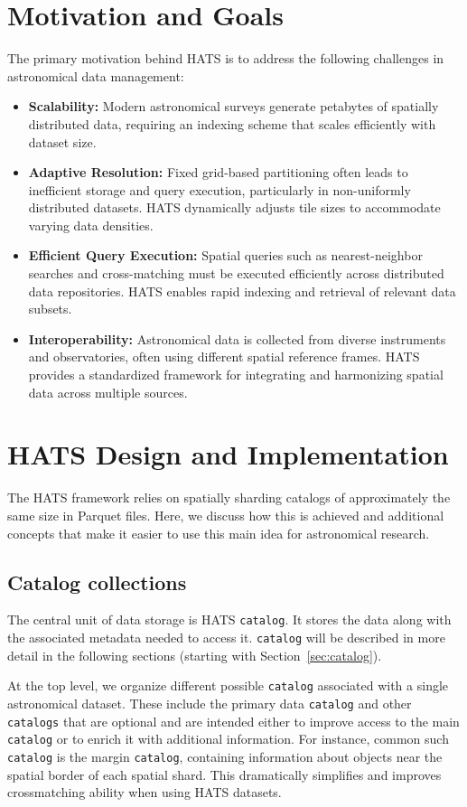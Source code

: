 \documentclass[11pt,a4paper]{ivoa}
\begin{document}
\section{Motivation and Goals}
    The primary motivation behind HATS is to address the following challenges in astronomical data management:
    \begin{itemize}
        \item \textbf{Scalability:} Modern astronomical surveys generate petabytes of spatially distributed data, requiring an indexing scheme that scales efficiently with dataset size.
        \item \textbf{Adaptive Resolution:} Fixed grid-based partitioning often leads to inefficient storage and query execution, particularly in non-uniformly distributed datasets. HATS dynamically adjusts tile sizes to accommodate varying data densities.
        \item \textbf{Efficient Query Execution:} Spatial queries such as nearest-neighbor searches and cross-matching must be executed efficiently across distributed data repositories. HATS enables rapid indexing and retrieval of relevant data subsets.
        \item \textbf{Interoperability:} Astronomical data is collected from diverse instruments and observatories, often using different spatial reference frames. HATS provides a standardized framework for integrating and harmonizing spatial data across multiple sources.
    \end{itemize}

\section{HATS Design and Implementation}
The HATS framework relies on spatially sharding catalogs 
of approximately the same size in Parquet files. Here, we discuss how this is achieved and
additional concepts that make it easier to use this main idea for astronomical
research.
    
\subsection{Catalog collections}
The central unit of data storage is HATS \texttt{catalog}. It stores the data along with the associated metadata needed to access it. \texttt{catalog} will be described in more detail in the following sections (starting with Section~\ref{sec:catalog}).\par
At the top level, we organize different possible \texttt{catalog} associated with a single astronomical dataset. These include the primary data \texttt{catalog} and other \texttt{catalogs} that are optional and are intended either to improve access to the main \texttt{catalog} or to enrich it with additional information. For instance, common such \texttt{catalog} is the margin \texttt{catalog}, containing information about objects near the spatial border of each spatial shard. This dramatically simplifies and improves crossmatching ability when using HATS datasets. \par 
\end{document}
